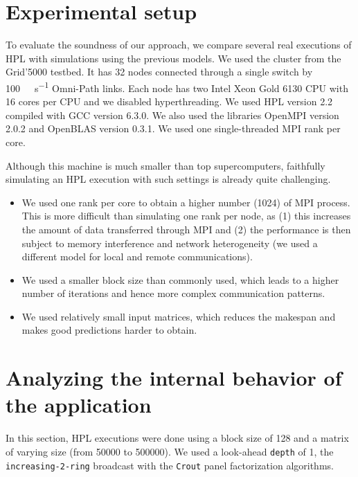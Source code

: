     \section{Experimental setup}%
    \label{sec:experimental_setup}
        To evaluate the soundness of our approach, we compare several real executions of HPL with simulations using the
        previous models.  We used the \dahu cluster from the Grid'5000 testbed. It has 32 nodes connected through a
        single switch by \SI{100}{\giga\bit\per\second} Omni-Path links. Each node has two Intel Xeon Gold 6130 CPU with
        16 cores per CPU and we disabled hyperthreading.  We used HPL version 2.2 compiled with GCC version 6.3.0. We
        also used the libraries OpenMPI version 2.0.2 and OpenBLAS version 0.3.1. We used one single-threaded
        MPI rank per core.

        Although this machine is much smaller than top supercomputers,  faithfully simulating an HPL execution with such
        settings is already quite challenging.
        \begin{itemize}
        \item We used one rank per core to obtain a higher number (1024) of MPI process. This is more difficult than
            simulating one rank per node, as (1) this increases the amount of data transferred through MPI and (2) the
            performance is then subject to memory interference and network heterogeneity (we used a different model for
            local and remote communications).
        \item We used a smaller block size than commonly used, which leads to a higher number of iterations and hence
            more complex communication patterns.
        \item We used relatively small input matrices, which reduces the makespan and makes good predictions harder to
            obtain.
        \end{itemize}

    \section{Analyzing the internal behavior of the application}%
    \label{sec:internal_behavior}

        In this section, HPL executions were done using a block size of 128 and a matrix of varying size (from
        \num{50000} to \num{500000}). We used a look-ahead \texttt{depth} of 1, the \texttt{increasing-2-ring}
        broadcast with the \texttt{Crout} panel factorization algorithms.

